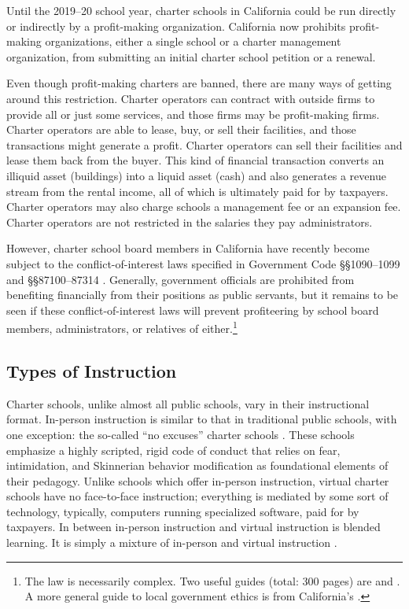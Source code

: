 Until the 2019–20 school year, charter schools in California could be run directly or indirectly by a profit-making organization. California now prohibits profit-making organizations, either a single school or a charter management organization, from submitting an initial charter school petition or a renewal.

Even though profit-making charters are banned, there are many ways of getting around this restriction. Charter operators can contract with outside firms to provide all or just some services, and those firms may be profit-making firms. Charter operators are able to lease, buy, or sell their facilities, and those transactions might generate a profit. Charter operators can sell their facilities and lease them back from the buyer. This kind of financial transaction converts an illiquid asset (buildings) into a liquid asset (cash) and also generates a revenue stream from the rental income, all of which is ultimately paid for by taxpayers. Charter operators may also charge schools a management fee or an expansion fee. Charter operators are not restricted in the salaries they pay administrators.

However, charter school board members in California have recently become subject to the conflict-of-interest laws specified in Government Code §§1090–1099 and §§87100–87314 \parencite{Becerra.Medeiros2018}. Generally, government officials are prohibited from benefiting financially from their positions as public servants, but it remains to be seen if these conflict-of-interest laws will prevent profiteering by school board members, administrators, or relatives of either.\footnote{The law is necessarily complex. Two useful guides (total: 300 pages) are \textcite{Chaney.etal2010} and \textcite{KevinEnnis.etal2016}. A more general guide to local government ethics is  from California's \citeauthor{InstituteForLocalGovernment2016} \parencite{InstituteForLocalGovernment2016}.}

\subsection{Types of Instruction}\indent

Charter schools, unlike almost all public schools, vary in their instructional format. In-person instruction is similar to that in traditional public schools, with one exception: the so-called ``no excuses'' charter schools \parencite{Horn2016, Torres.Golann2018, Golann2021}. These schools emphasize a highly scripted, rigid code of conduct that relies on fear, intimidation, and Skinnerian behavior modification as foundational elements of their pedagogy.  Unlike schools which offer in-person instruction, virtual charter schools have no face-to-face instruction; everything is mediated by some sort of technology, typically, computers running specialized software, paid for by taxpayers. In between in-person instruction and virtual instruction is blended learning. It is simply a mixture of in-person and virtual instruction \parencite{Horn.Staker2015}.

